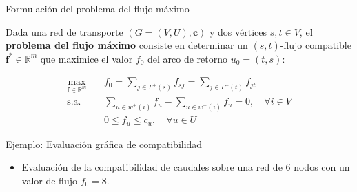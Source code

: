\documentclass[
  ignorenonframetext,
]{beamer}
\providecommand{\tightlist}{%
  \setlength{\itemsep}{0pt}\setlength{\parskip}{0pt}}
\begin{document}
\begin{frame}{Formulación del problema del flujo máximo}
\label{formulaciuxf3n-del-problema-del-flujo-muxe1ximo}
\begin{tcolorbox}[enhanced jigsaw, opacityback=0, breakable, title=\textcolor{quarto-callout-note-color}{\faInfo}\hspace{0.5em}{Problema del flujo máximo}, colback=white, colbacktitle=quarto-callout-note-color!10!white, bottomrule=.15mm, opacitybacktitle=0.6, coltitle=black, bottomtitle=1mm, leftrule=.75mm, colframe=quarto-callout-note-color-frame, toptitle=1mm, titlerule=0mm, rightrule=.15mm, left=2mm, arc=.35mm, toprule=.15mm]

Dada una red de transporte \((G = (V, U), \mathbf{c})\) y dos vértices
\(s, t \in V\), el \textbf{problema del flujo máximo} consiste en
determinar un \((s, t)\)-flujo compatible
\(\mathbf{f}^* \in \mathbb{R}^m\) que maximice el valor \(f_0\) del arco
de retorno \(u_0 = (t, s)\):

\[
\begin{aligned}
\max_{\mathbf{f} \in \mathbb{R}^m} \quad & f_0 = \sum_{j \in \Gamma^+(s)} f_{sj} = \sum_{j \in \Gamma^-(t)} f_{jt} \\
\text{s.a.} \quad & \sum_{u \in w^+(i)} f_u - \sum_{u \in w^-(i)} f_u = 0, \quad \forall i \in V \\
& 0 \le f_u \le c_u, \quad \forall u \in U
\end{aligned}
\]

\end{tcolorbox}
\end{frame}

\begin{frame}{Ejemplo: Evaluación gráfica de compatibilidad}
\label{ejemplo-evaluaciuxf3n-gruxe1fica-de-compatibilidad}
\begin{itemize}
\tightlist
\item
  Evaluación de la compatibilidad de caudales sobre una red de 6 nodos
  con un valor de flujo \(f_0 = 8\).
\end{itemize}
\end{frame}
\end{document}
